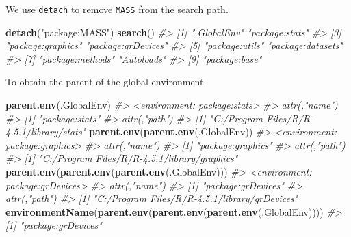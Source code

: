 \documentclass[
]{book}
\newenvironment{Shaded}{\begin{snugshade}}{\end{snugshade}}
\newcommand{\CommentTok}[1]{\textcolor[rgb]{0.56,0.35,0.01}{\textit{#1}}}
\newcommand{\FunctionTok}[1]{\textcolor[rgb]{0.13,0.29,0.53}{\textbf{#1}}}
\newcommand{\NormalTok}[1]{#1}
\newcommand{\StringTok}[1]{\textcolor[rgb]{0.31,0.60,0.02}{#1}}
\begin{document}
We use \texttt{detach} to remove \texttt{MASS} from the search path.

\begin{Shaded}
\begin{Highlighting}[]
\FunctionTok{detach}\NormalTok{(}\StringTok{"package:MASS"}\NormalTok{)}
\FunctionTok{search}\NormalTok{()}
\CommentTok{\#\textgreater{} [1] ".GlobalEnv"        "package:stats"    }
\CommentTok{\#\textgreater{} [3] "package:graphics"  "package:grDevices"}
\CommentTok{\#\textgreater{} [5] "package:utils"     "package:datasets" }
\CommentTok{\#\textgreater{} [7] "package:methods"   "Autoloads"        }
\CommentTok{\#\textgreater{} [9] "package:base"}
\end{Highlighting}
\end{Shaded}

To obtain the parent of the global environment

\begin{Shaded}
\begin{Highlighting}[]
\FunctionTok{parent.env}\NormalTok{(.GlobalEnv)}
\CommentTok{\#\textgreater{} \textless{}environment: package:stats\textgreater{}}
\CommentTok{\#\textgreater{} attr(,"name")}
\CommentTok{\#\textgreater{} [1] "package:stats"}
\CommentTok{\#\textgreater{} attr(,"path")}
\CommentTok{\#\textgreater{} [1] "C:/Program Files/R/R{-}4.5.1/library/stats"}
\FunctionTok{parent.env}\NormalTok{(}\FunctionTok{parent.env}\NormalTok{(.GlobalEnv))}
\CommentTok{\#\textgreater{} \textless{}environment: package:graphics\textgreater{}}
\CommentTok{\#\textgreater{} attr(,"name")}
\CommentTok{\#\textgreater{} [1] "package:graphics"}
\CommentTok{\#\textgreater{} attr(,"path")}
\CommentTok{\#\textgreater{} [1] "C:/Program Files/R/R{-}4.5.1/library/graphics"}
\FunctionTok{parent.env}\NormalTok{(}\FunctionTok{parent.env}\NormalTok{(}\FunctionTok{parent.env}\NormalTok{(.GlobalEnv)))}
\CommentTok{\#\textgreater{} \textless{}environment: package:grDevices\textgreater{}}
\CommentTok{\#\textgreater{} attr(,"name")}
\CommentTok{\#\textgreater{} [1] "package:grDevices"}
\CommentTok{\#\textgreater{} attr(,"path")}
\CommentTok{\#\textgreater{} [1] "C:/Program Files/R/R{-}4.5.1/library/grDevices"}
\FunctionTok{environmentName}\NormalTok{(}\FunctionTok{parent.env}\NormalTok{(}\FunctionTok{parent.env}\NormalTok{(}\FunctionTok{parent.env}\NormalTok{(.GlobalEnv))))}
\CommentTok{\#\textgreater{} [1] "package:grDevices"}
\end{Highlighting}
\end{Shaded}
\end{document}
